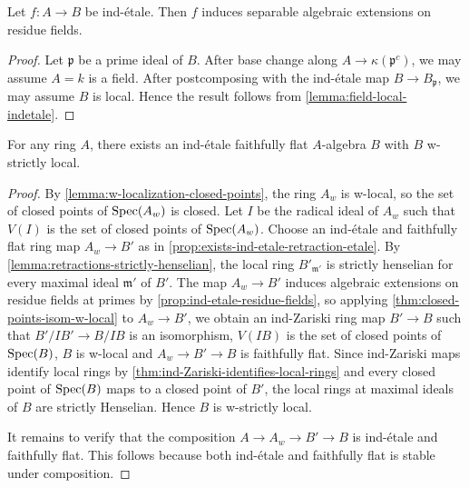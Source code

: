 \begin{proposition}
    Let $f\colon A \to B$ be ind-étale. Then $f$ induces separable algebraic extensions on residue fields.
    \label{prop:ind-etale-residue-fields}
\end{proposition}

\begin{proof}
    Let $\mathfrak{p}$ be a prime ideal of $B$. After base change along $A \to \kappa(\mathfrak{p}^c)$,
    we may assume $A = k$ is a field. After postcomposing with the ind-étale map $B \to B_{\mathfrak{p}}$,
    we may assume $B$ is local. Hence the result follows from \ref{lemma:field-local-indetale}.
\end{proof}

\begin{proposition}
    For any ring \(A\), there exists an ind-étale faithfully flat \(A\)-algebra \(B\) with \(B\) w-strictly local.
    \label{thm:ind-etale-w-strictly-local-cover}
\end{proposition}

\begin{proof}
    By \ref{lemma:w-localization-closed-points}, the ring $A_w$ is w-local, so the set of closed points
    of $\mathrm{Spec}(A_w)$ is closed.
    Let $I$ be the radical ideal of $A_w$ such that $V(I)$ is the set of closed points of $\mathrm{Spec}(A_w)$.
    Choose an ind-étale and faithfully flat ring map $A_w \to B'$ as in
    \ref{prop:exists-ind-etale-retraction-etale}. By
    \ref{lemma:retractions-strictly-henselian}, the local ring $B'_{\mathfrak{m}'}$ is
    strictly henselian for every maximal ideal $\mathfrak{m}'$ of $B'$.
    The map $A_w \to B'$ induces algebraic extensions on residue fields at primes by
    \ref{prop:ind-etale-residue-fields},
    so applying \ref{thm:closed-points-isom-w-local} to $A_w \to B'$, we obtain
    an ind-Zariski ring map $B' \to B$ such that $B'/IB' \to B/IB$ is an isomorphism,
    $V(IB)$ is the set of closed points of $\mathrm{Spec}(B)$, $B$ is w-local
    and $A_w \to B' \to B$ is faithfully flat. Since ind-Zariski maps identify
    local rings by \ref{thm:ind-Zariski-identifies-local-rings} and every closed point of
    $\mathrm{Spec}(B)$ maps to a closed point of $B'$,
    the local rings at maximal ideals of $B$ are strictly Henselian. Hence $B$ is w-strictly local.

    It remains to verify that the composition $A \to A_w \to B' \to B$ is ind-étale and faithfully flat.
    This follows because both ind-étale and faithfully flat is stable under composition.
\end{proof}

